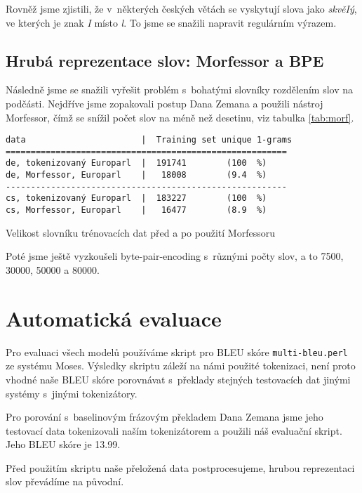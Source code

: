 \documentclass[a4]{article}
\begin{document}
Rovněž jsme zjistili, že v~některých českých větách se vyskytují slova jako
{\it skvěIý}, ve kterých je znak {\it I} místo {\it l}. To jsme se snažili
napravit regulárním výrazem.

\subsection{Hrubá reprezentace slov: Morfessor a BPE}

Následně jsme se snažili vyřešit problém s~bohatými slovníky rozdělením
slov na podčásti. Nejdříve jsme zopakovali postup Dana Zemana a použili
nástroj Morfessor\cite{morfessor}, čímž se snížil počet slov na méně než
desetinu, viz tabulka \ref{tab:morf}.


\begin{table}[ht]
\begin{verbatim}
data                       |  Training set unique 1-grams
========================================================
de, tokenizovaný Europarl  |  191741        (100  %)
de, Morfessor, Europarl    |   18008        (9.4  %)
--------------------------------------------------------
cs, tokenizovaný Europarl  |  183227        (100  %)
cs, Morfessor, Europarl    |   16477        (8.9  %)
\end{verbatim}
\caption{Velikost slovníku trénovacích dat před a po použití Morfessoru}
\label{tab:morf}
\end{table}



Poté jsme ještě vyzkoušeli
byte-pair-encoding s~různými počty slov, a to 7500, 30000, 50000 a 80000.


\section{Automatická evaluace}

Pro evaluaci všech modelů používáme skript pro BLEU skóre \texttt{multi-bleu.perl} ze systému
Moses\cite{moses}. Výsledky skriptu záleží na námi použité tokenizaci, není
proto vhodné naše BLEU skóre porovnávat
s~překlady stejných testovacích dat jinými systémy s~jinými tokenizátory.

Pro porování s~baselinovým frázovým překladem Dana Zemana jsme jeho
testovací data tokenizovali naším tokenizátorem a použili náš evaluační
skript. Jeho BLEU skóre je 13.99.

Před použitím skriptu naše přeložená data postprocesujeme, hrubou reprezentaci
slov převádíme na původní.
\end{document}
